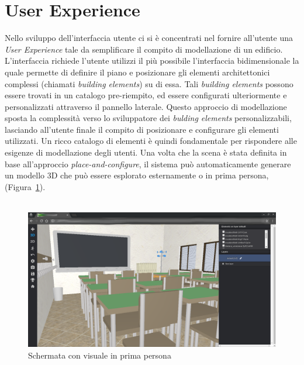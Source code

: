 \section{User Experience}
\label{sec:chapter_2_section_1}


Nello sviluppo dell'interfaccia utente ci si è concentrati nel fornire all'utente una \emph{User Experience} tale
da semplificare il compito di modellazione di un edificio.
L'interfaccia richiede l'utente utilizzi il più possibile l'interfaccia bidimensionale la quale permette
di definire il piano e posizionare gli elementi architettonici complessi (chiamati \emph{building elements}) su di essa.
Tali \emph{building elements} possono essere trovati in un catalogo pre-riempito, ed essere
configurati ulteriormente e personalizzati attraverso il pannello laterale. Questo approccio
di modellazione sposta la complessità verso lo sviluppatore dei \emph{bulding elements} personalizzabili,
lasciando all'utente finale il compito di posizionare e configurare gli elementi utilizzati.
Un ricco catalogo di elementi \`e quindi fondamentale per rispondere alle esigenze di modellazione degli utenti.
Una volta che la scena \`e stata definita in base all'approccio \emph{place-and-configure}, il sistema pu\`o automaticamente
generare un modello 3D che pu\`o essere esplorato esternamente o in prima persona,
(Figura~\ref{fig:3D-school}).\\\\

\begin{figure}[htbp] %
   \centering
   \includegraphics[width=1\linewidth]{images/3d-school}
   \caption{Schermata con visuale in prima persona}
   \label{fig:3D-school}
\end{figure}

